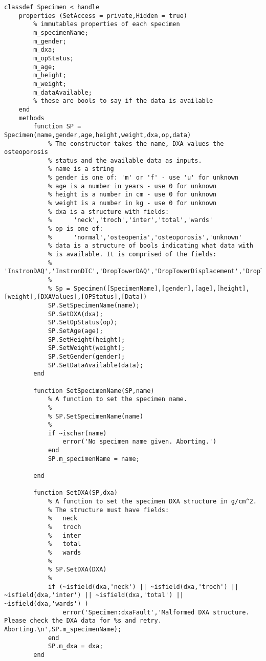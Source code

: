 \begin{lstlisting}
classdef Specimen < handle
    properties (SetAccess = private,Hidden = true)
        % immutables properties of each specimen
        m_specimenName;
        m_gender;
        m_dxa;
        m_opStatus;
        m_age;
        m_height;
        m_weight;
        m_dataAvailable;
        % these are bools to say if the data is available
    end
    methods
        function SP = Specimen(name,gender,age,height,weight,dxa,op,data)
            % The constructor takes the name, DXA values the osteoporosis
            % status and the available data as inputs.
            % name is a string
            % gender is one of: 'm' or 'f' - use 'u' for unknown
            % age is a number in years - use 0 for unknown
            % height is a number in cm - use 0 for unknown
            % weight is a number in kg - use 0 for unknown
            % dxa is a structure with fields:
            %      'neck','troch','inter','total','wards'
            % op is one of:
            %      'normal','osteopenia','osteoporosis','unknown'
            % data is a structure of bools indicating what data with 
            % is available. It is comprised of the fields:
            %      'InstronDAQ','InstronDIC','DropTowerDAQ','DropTowerDisplacement','DropTowerDIC'
            %
            % Sp = Specimen([SpecimenName],[gender],[age],[height],[weight],[DXAValues],[OPStatus],[Data])
            SP.SetSpecimenName(name);
            SP.SetDXA(dxa);
            SP.SetOpStatus(op);
            SP.SetAge(age);
            SP.SetHeight(height);
            SP.SetWeight(weight);
            SP.SetGender(gender);
            SP.SetDataAvailable(data);
        end
        
        function SetSpecimenName(SP,name)
            % A function to set the specimen name.
            %
            % SP.SetSpecimenName(name)
            %
            if ~ischar(name)
                error('No specimen name given. Aborting.')
            end
            SP.m_specimenName = name;

        end
        
        function SetDXA(SP,dxa)
            % A function to set the specimen DXA structure in g/cm^2.
            % The structure must have fields:
            %   neck
            %   troch
            %   inter
            %   total
            %   wards
            %
            % SP.SetDXA(DXA)
            %
            if (~isfield(dxa,'neck') || ~isfield(dxa,'troch') || ~isfield(dxa,'inter') || ~isfield(dxa,'total') || ~isfield(dxa,'wards') )
                error('Specimen:dxaFault','Malformed DXA structure. Please check the DXA data for %s and retry. Aborting.\n',SP.m_specimenName);
            end
            SP.m_dxa = dxa;
        end
        

\end{lstlisting}
